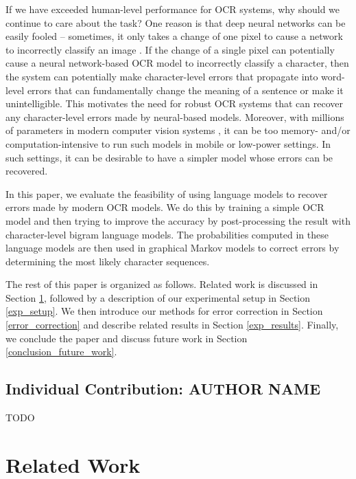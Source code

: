 \documentclass[10pt,twocolumn,letterpaper]{article}
\begin{document}
If we have exceeded human-level performance for OCR systems, why should we
continue to care about the task? One reason is that deep neural networks
can be easily fooled -- sometimes, it only takes a change of one pixel
to cause a network to incorrectly classify an image \cite{Su17-OPA}.
If the change of a single pixel can potentially cause a neural
network-based OCR model to incorrectly classify a character, then
the system can potentially make character-level errors that propagate
into word-level errors that can fundamentally change the meaning of
a sentence or make it unintelligible. This motivates the need for
robust OCR systems that can recover any character-level errors made
by neural-based models. Moreover, with millions of parameters in modern
computer vision systems \cite{AlexNet, VGG}, it can be too memory-
and/or computation-intensive to run such models in mobile or low-power
settings. In such settings, it can be desirable to have a simpler model
whose errors can be recovered.

In this paper, we evaluate the feasibility of using language
models to recover errors made by modern OCR models.  We do this
by training a simple OCR model and then trying to improve the
accuracy by post-processing the result with character-level
bigram language models. The probabilities computed in these language
models are then used in graphical Markov models to correct errors by
determining the most likely character sequences.

The rest of this paper is organized as follows. Related work is
discussed in Section \ref{related_work}, followed by a
description of our experimental setup in Section \ref{exp_setup}.
We then introduce our methods for error correction in Section 
\ref{error_correction} and describe related results in
Section \ref{exp_results}. Finally, we conclude the paper and
discuss future work in Section \ref{conclusion_future_work}.

\subsection{Individual Contribution: AUTHOR NAME}
\label{individual_contribution}
TODO



\section{Related Work}
\label{related_work}
\end{document}
